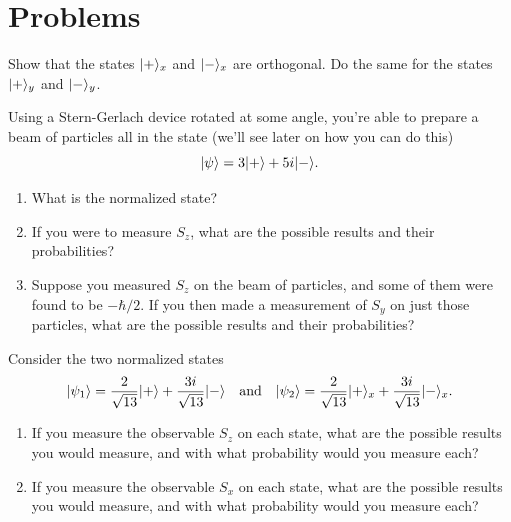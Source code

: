 \section*{Problems}
%

\begin{problem}[Orthogonality]
Show that the states $| + \rangle_x$ and $| - \rangle_x$ are orthogonal.  Do the same for the states $| + \rangle_y$ and $| - \rangle_y$. 
\end{problem}


\begin{problem}[Measurements]
Using a Stern-Gerlach device rotated at some angle, you're able to prepare a beam of particles all in the state  (we'll see later on how you can do this)
\[
| \psi \rangle = 3 | + \rangle + 5i | - \rangle.
\]
\begin{enumerate}[label=(\alph*)]
\item What is the normalized state?
\item If you were to measure $S_z$, what are the possible results and their probabilities?
\item Suppose you measured $S_z$ on the beam of particles, and some of them were found to be $-\hbar/2$.  If you then made a measurement of $S_y$ on just those particles, what are the possible results and their probabilities? 
\end{enumerate}
\end{problem}


\begin{problem}
Consider the two normalized states 
\[
| \psi_1 \rangle = \frac{2}{\sqrt{13}} | + \rangle + \frac{3i}{\sqrt{13}} | - \rangle \quad \text{and} \quad | \psi_2 \rangle = \frac{2}{\sqrt{13}} | + \rangle_x + \frac{3i}{\sqrt{13}} | - \rangle_x.
\]
\begin{enumerate}[label=(\alph*)]
\item If you measure the observable $S_z$ on each state, what are the possible results you would measure, and with what probability would you measure each?
\item If you measure the observable $S_x$ on each state, what are the possible results you would measure, and with what probability would you measure each?
\end{enumerate}
\end{problem}



